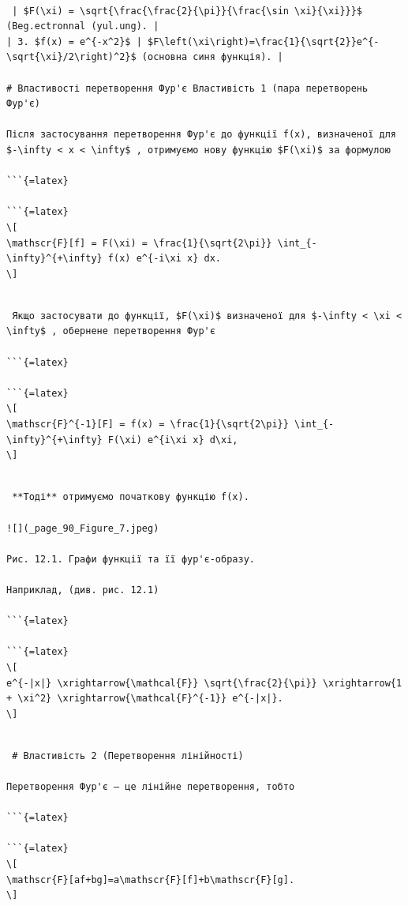 \documentclass[
  ukrainian,
]{article}
\begin{document}
\begin{verbatim}

 | $F(\xi) = \sqrt{\frac{\frac{2}{\pi}}{\frac{\sin \xi}{\xi}}}$ (Beg.ectronnal (yul.ung). |
| 3. $f(x) = e^{-x^2}$ | $F\left(\xi\right)=\frac{1}{\sqrt{2}}e^{-\sqrt{\xi}/2\right)^2}$ (основна синя функція). |

# Властивості перетворення Фур'є Властивість 1 (пара перетворень Фур'є)

Після застосування перетворення Фур'є до функції f(x), визначеної для $-\infty < x < \infty$ , отримуємо нову функцію $F(\xi)$ за формулою

```{=latex}

```{=latex}
\[
\mathscr{F}[f] = F(\xi) = \frac{1}{\sqrt{2\pi}} \int_{-\infty}^{+\infty} f(x) e^{-i\xi x} dx.
\]
\end{verbatim}

\begin{verbatim}

 Якщо застосувати до функції, $F(\xi)$ визначеної для $-\infty < \xi < \infty$ , обернене перетворення Фур'є

```{=latex}

```{=latex}
\[
\mathscr{F}^{-1}[F] = f(x) = \frac{1}{\sqrt{2\pi}} \int_{-\infty}^{+\infty} F(\xi) e^{i\xi x} d\xi,
\]
\end{verbatim}

\begin{verbatim}

 **Тоді** отримуємо початкову функцію f(x).

![](_page_90_Figure_7.jpeg)

Рис. 12.1. Графи функції та її фур'є-образу.

Наприклад, (див. рис. 12.1)

```{=latex}

```{=latex}
\[
e^{-|x|} \xrightarrow{\mathcal{F}} \sqrt{\frac{2}{\pi}} \xrightarrow{1 + \xi^2} \xrightarrow{\mathcal{F}^{-1}} e^{-|x|}.
\]
\end{verbatim}

\begin{verbatim}

 # Властивість 2 (Перетворення лінійності)

Перетворення Фур'є — це лінійне перетворення, тобто

```{=latex}

```{=latex}
\[
\mathscr{F}[af+bg]=a\mathscr{F}[f]+b\mathscr{F}[g].
\]
\end{verbatim}
\end{document}
